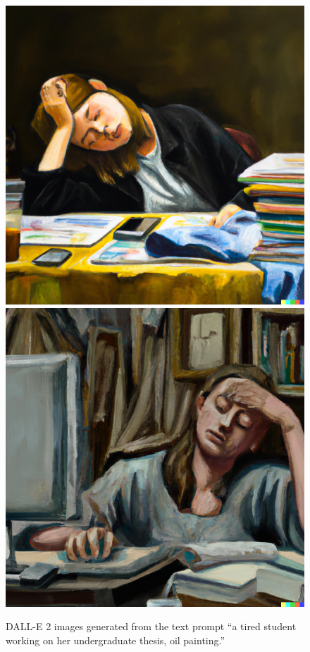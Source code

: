 \documentclass[12pt,twoside]{reedthesis}
\begin{document}
\begin{figure}
\centering
\includegraphics[scale=0.15]{DALLE_tired_student}
\includegraphics[scale=0.15]{DALLE_tired_student1.png}
\caption{DALL-E 2 images generated from the text prompt “a tired student working on her undergraduate thesis, oil painting.”}
\label{fig-tired-student}
\end{figure}
\end{document}
